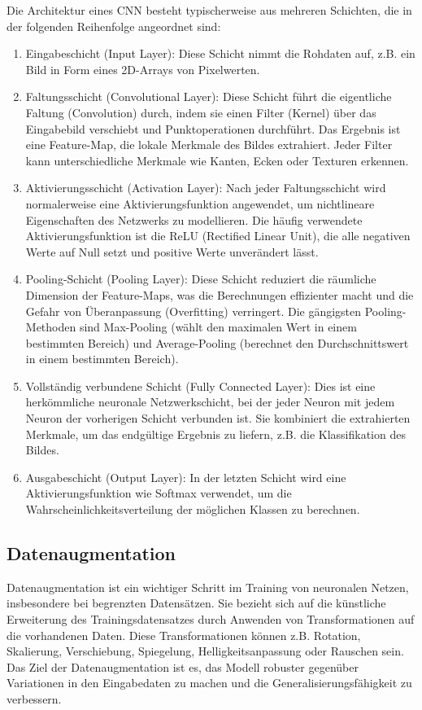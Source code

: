 Die Architektur eines CNN besteht typischerweise aus mehreren Schichten, die in der folgenden Reihenfolge angeordnet sind:

\begin{enumerate}[]
	\item Eingabeschicht (Input Layer): Diese Schicht nimmt die Rohdaten auf, z.B. ein Bild in Form eines 2D-Arrays von Pixelwerten.
	\item Faltungsschicht (Convolutional Layer): Diese Schicht führt die eigentliche Faltung (Convolution) durch, indem sie einen Filter (Kernel) über das Eingabebild verschiebt und Punktoperationen durchführt. Das Ergebnis ist eine Feature-Map, die lokale Merkmale des Bildes extrahiert. Jeder Filter kann unterschiedliche Merkmale wie Kanten, Ecken oder Texturen erkennen.
	\item Aktivierungsschicht (Activation Layer): Nach jeder Faltungsschicht wird normalerweise eine Aktivierungsfunktion angewendet, um nichtlineare Eigenschaften des Netzwerks zu modellieren. Die häufig verwendete Aktivierungsfunktion ist die ReLU (Rectified Linear Unit), die alle negativen Werte auf Null setzt und positive Werte unverändert lässt.
	\item Pooling-Schicht (Pooling Layer): Diese Schicht reduziert die räumliche Dimension der Feature-Maps, was die Berechnungen effizienter macht und die Gefahr von Überanpassung (Overfitting) verringert. Die gängigsten Pooling-Methoden sind Max-Pooling (wählt den maximalen Wert in einem bestimmten Bereich) und Average-Pooling (berechnet den Durchschnittswert in einem bestimmten Bereich).
	\item Vollständig verbundene Schicht (Fully Connected Layer): Dies ist eine herkömmliche neuronale Netzwerkschicht, bei der jeder Neuron mit jedem Neuron der vorherigen Schicht verbunden ist. Sie kombiniert die extrahierten Merkmale, um das endgültige Ergebnis zu liefern, z.B. die Klassifikation des Bildes.
	\item Ausgabeschicht (Output Layer): In der letzten Schicht wird eine Aktivierungsfunktion wie Softmax verwendet, um die Wahrscheinlichkeitsverteilung der möglichen Klassen zu berechnen.
\end{enumerate}

\subsection{Datenaugmentation}

Datenaugmentation ist ein wichtiger Schritt im Training von neuronalen Netzen, insbesondere bei begrenzten Datensätzen. Sie bezieht sich auf die künstliche Erweiterung des Trainingsdatensatzes durch Anwenden von Transformationen auf die vorhandenen Daten. Diese Transformationen können z.B. Rotation, Skalierung, Verschiebung, Spiegelung, Helligkeitsanpassung oder Rauschen sein. Das Ziel der Datenaugmentation ist es, das Modell robuster gegenüber Variationen in den Eingabedaten zu machen und die Generalisierungsfähigkeit zu verbessern.

